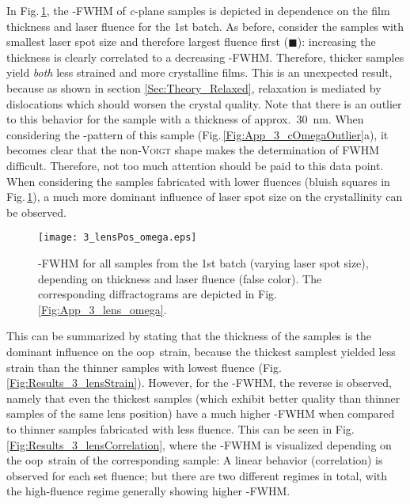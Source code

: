 In Fig.\,\ref{Fig:Results_3_lensOmega}, the \textomega-FWHM of \textit{c}-plane samples is depicted in dependence on the film thickness and laser fluence for the 1st batch.
As before, consider the samples with smallest laser spot size and therefore largest fluence first (\textcolor{col-L-2}{$\blacksquare$}):
increasing the thickness is clearly correlated to a decreasing \textomega-FWHM.
Therefore, thicker samples yield \emph{both} less strained and more crystalline films.
This is an unexpected result, because as shown in section \ref{Sec:Theory_Relaxed}, relaxation is mediated by dislocations which should worsen the crystal quality.
Note that there is an outlier to this behavior for the sample with a thickness of approx.\ \qty{30}{\nm}.
When considering the \textomega-pattern of this sample (Fig.\,\ref{Fig:App_3_cOmegaOutlier}a), it becomes clear that the non-\textsc{Voigt} shape makes the determination of \gls{FWHM} difficult.
Therefore, not too much attention should be paid to this data point.
When considering the samples fabricated with lower fluences (bluish squares in Fig.\,\ref{Fig:Results_3_lensOmega}), a much more dominant influence of laser spot size on the crystallinity can be observed.
\begin{figure}
    \centering
    \texttt{[image: 3\_lensPos\_omega.eps]}
    \caption{
        \textomega-FWHM for all samples from the 1st batch (varying laser spot size), depending on thickness and laser fluence (false color).
        The corresponding diffractograms are depicted in Fig.\,\ref{Fig:App_3_lens_omega}.
    }
    \label{Fig:Results_3_lensOmega}
\end{figure}
This can be summarized by stating that the thickness of the samples is the dominant influence on the \gls{oop}\ strain, because the thickest samplest yielded less strain than the thinner samples with lowest fluence (Fig.\,\ref{Fig:Results_3_lensStrain}).
However, for the \textomega-FWHM, the reverse is observed, namely that even the thickest samples (which exhibit better quality than thinner samples of the same lens position) have a much higher \textomega-FWHM when compared to thinner samples fabricated with less fluence.
This can be seen in Fig.\,\ref{Fig:Results_3_lensCorrelation}, where the \textomega-FWHM is visualized depending on the \gls{oop}\ strain of the corresponding sample:
A linear behavior (correlation) is observed for each set fluence; but there are two different regimes in total, with the high-fluence regime generally showing higher \textomega-FWHM.